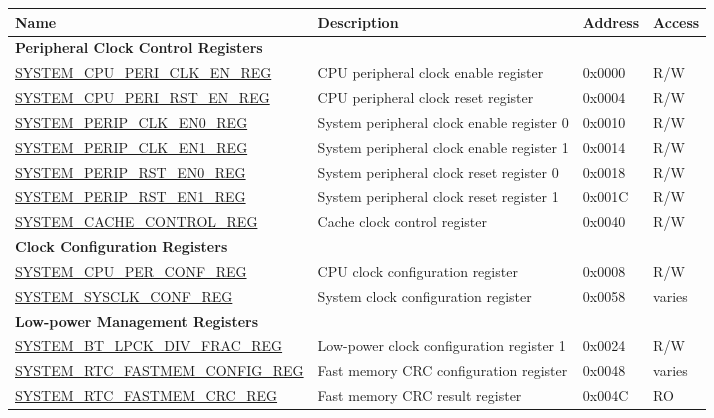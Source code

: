 \begin{longtable}{ | p{6.5cm} | p{6.5cm} | p{1.3cm} | p{1cm} | }
\hline\rowcolor{lightgray}
Name & Description &  Address & Access \\ \hline
\endhead
\multicolumn{4}{|l|}{\textbf{Peripheral Clock Control Registers}} \\ \hline
\hyperref[regdesc:SYSTEMCPUPERICLKENREG]{SYSTEM\_CPU\_PERI\_CLK\_EN\_REG} & CPU peripheral clock enable register & 0x0000 & R/W \\ \hline
\hyperref[regdesc:SYSTEMCPUPERIRSTENREG]{SYSTEM\_CPU\_PERI\_RST\_EN\_REG} & CPU peripheral clock reset register & 0x0004 & R/W \\ \hline
\hyperref[regdesc:SYSTEMPERIPCLKEN0REG]{SYSTEM\_PERIP\_CLK\_EN0\_REG} & System peripheral clock enable register 0 & 0x0010 & R/W \\ \hline
\hyperref[regdesc:SYSTEMPERIPCLKEN1REG]{SYSTEM\_PERIP\_CLK\_EN1\_REG} & System peripheral clock enable register 1 & 0x0014 & R/W \\ \hline
\hyperref[regdesc:SYSTEMPERIPRSTEN0REG]{SYSTEM\_PERIP\_RST\_EN0\_REG} & System peripheral clock reset register 0 & 0x0018 & R/W \\ \hline
\hyperref[regdesc:SYSTEMPERIPRSTEN1REG]{SYSTEM\_PERIP\_RST\_EN1\_REG} & System peripheral clock reset register 1 & 0x001C & R/W \\ \hline
\hyperref[regdesc:SYSTEMCACHECONTROLREG]{SYSTEM\_CACHE\_CONTROL\_REG} & Cache clock control register & 0x0040 & R/W \\ \hline
\multicolumn{4}{|l|}{\textbf{Clock Configuration Registers}} \\ \hline
\hyperref[regdesc:SYSTEMCPUPERCONFREG]{SYSTEM\_CPU\_PER\_CONF\_REG} & CPU clock configuration register & 0x0008 & R/W \\ \hline
\hyperref[regdesc:SYSTEMSYSCLKCONFREG]{SYSTEM\_SYSCLK\_CONF\_REG} & System clock configuration register & 0x0058 & varies \\ \hline
\multicolumn{4}{|l|}{\textbf{Low-power Management Registers}} \\ \hline
\hyperref[regdesc:SYSTEMBTLPCKDIVFRACREG]{SYSTEM\_BT\_LPCK\_DIV\_FRAC\_REG} & Low-power clock configuration register 1 & 0x0024 & R/W \\ \hline
\hyperref[regdesc:SYSTEMRTCFASTMEMCONFIGREG]{SYSTEM\_RTC\_FASTMEM\_CONFIG\_REG} & Fast memory CRC configuration register & 0x0048 & varies \\ \hline
\hyperref[regdesc:SYSTEMRTCFASTMEMCRCREG]{SYSTEM\_RTC\_FASTMEM\_CRC\_REG} & Fast memory CRC result register & 0x004C & RO \\ \hline

\end{longtable}
